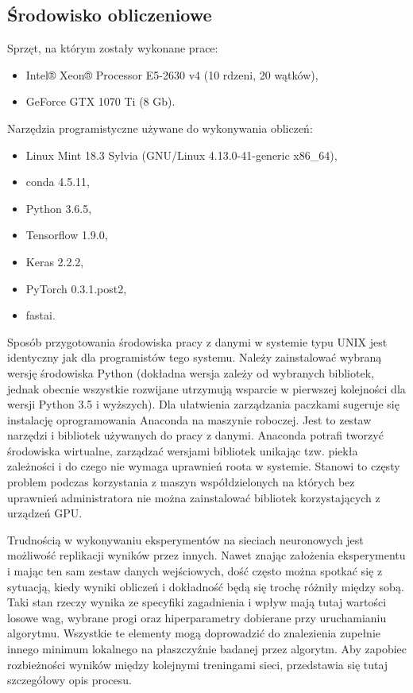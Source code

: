 \documentclass[12pt,a4paper,twoside,titlepage,openright]{book}
\begin{document}
\begin{itemize}
\begin{itemize}
\subsection{Środowisko obliczeniowe}
Sprzęt, na którym zostały wykonane prace:
\begin{itemize}
\item Intel® Xeon® Processor E5-2630 v4 (10 rdzeni, 20 wątków),
\item GeForce GTX 1070 Ti (8 Gb).
\end{itemize}

Narzędzia programistyczne używane do wykonywania obliczeń:
\begin{itemize}
\item Linux Mint 18.3 Sylvia (GNU/Linux 4.13.0-41-generic x86\_64),
\item conda 4.5.11,
\item Python 3.6.5,
\item Tensorflow 1.9.0,
\item Keras 2.2.2,
\item PyTorch 0.3.1.post2,
\item fastai.
\end{itemize}

Sposób przygotowania środowiska pracy z danymi w systemie typu UNIX jest identyczny jak dla programistów tego systemu. Należy zainstalować wybraną wersję środowiska Python (dokładna wersja zależy od wybranych bibliotek, jednak obecnie wszystkie rozwijane utrzymują wsparcie w pierwszej kolejności dla wersji Python 3.5 i wyższych). Dla ułatwienia zarządzania paczkami sugeruje się instalację oprogramowania Anaconda na maszynie roboczej. Jest to zestaw narzędzi i bibliotek używanych do pracy z danymi. Anaconda potrafi tworzyć środowiska wirtualne, zarządzać wersjami bibliotek unikając tzw. piekła zależności i do czego nie wymaga uprawnień roota w systemie. Stanowi to częsty problem podczas korzystania z maszyn współdzielonych na których bez uprawnień administratora nie można zainstalować bibliotek korzystających z urządzeń GPU.

Trudnością  w wykonywaniu eksperymentów na sieciach neuronowych jest możliwość replikacji wyników przez innych. Nawet znając założenia eksperymentu i mając ten sam zestaw danych wejściowych, dość często można spotkać się z sytuacją, kiedy wyniki obliczeń i dokładność będą się trochę różniły między sobą. Taki stan rzeczy wynika ze specyfiki zagadnienia i wpływ mają tutaj wartości losowe wag, wybrane progi oraz hiperparametry dobierane przy uruchamianiu algorytmu. Wszystkie te elementy mogą doprowadzić do znalezienia zupełnie innego minimum lokalnego na płaszczyźnie badanej przez algorytm. Aby zapobiec rozbieżności wyników między kolejnymi treningami sieci, przedstawia się tutaj szczegółowy opis procesu.


\end{itemize}
\end{itemize}
\end{document}
